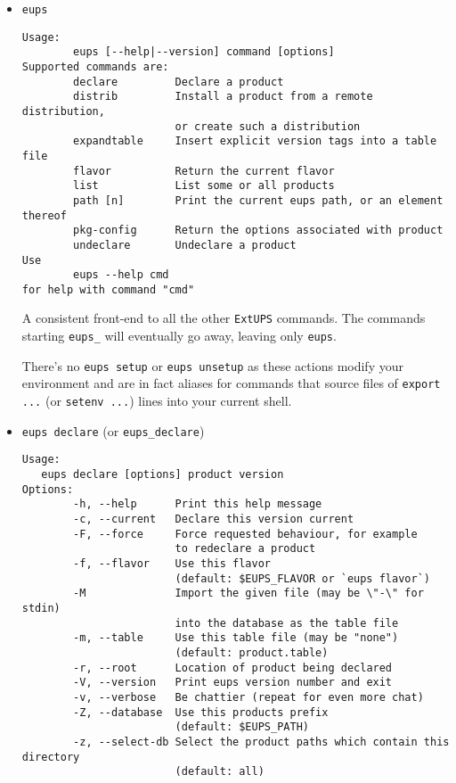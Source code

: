 \documentclass{article}
\newcommand{\code}[1]{\texttt{#1}}
\newcommand{\eups}{\code{ExtUPS}}
\begin{document}
\begin{itemize}


  \item \code{eups}
\begin{verbatim}
Usage:
        eups [--help|--version] command [options]
Supported commands are:
        declare         Declare a product
        distrib         Install a product from a remote distribution,
                        or create such a distribution 
        expandtable     Insert explicit version tags into a table file
        flavor          Return the current flavor
        list            List some or all products
        path [n]        Print the current eups path, or an element thereof
        pkg-config      Return the options associated with product
        undeclare       Undeclare a product
Use
        eups --help cmd
for help with command "cmd"
\end{verbatim}
  
A consistent front-end to all the other \eups{} commands.  The commands
starting \code{eups\_} will eventually go away, leaving only \code{eups}.

There's no \code{eups setup} or \code{eups unsetup} as these actions
modify your environment and are in fact aliases for commands
that source files of \code{export ...} (or \code{setenv ...}) lines
into your current shell.



\item \code{eups declare} (or \code{eups\_declare})
\begin{verbatim}
Usage:
   eups declare [options] product version
Options:
        -h, --help      Print this help message
        -c, --current   Declare this version current
        -F, --force     Force requested behaviour, for example
                        to redeclare a product
        -f, --flavor    Use this flavor
                        (default: $EUPS_FLAVOR or `eups flavor`)
        -M              Import the given file (may be \"-\" for stdin)
                        into the database as the table file
        -m, --table     Use this table file (may be "none")
                        (default: product.table)
        -r, --root      Location of product being declared
        -V, --version   Print eups version number and exit
        -v, --verbose   Be chattier (repeat for even more chat)
        -Z, --database  Use this products prefix
                        (default: $EUPS_PATH)
        -z, --select-db Select the product paths which contain this directory 
                        (default: all)
\end{verbatim}


\end{itemize}
\end{document}

